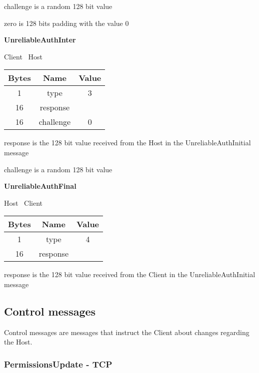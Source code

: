 challenge is a random 128 bit value

zero is 128 bits padding with the value 0

\textbf{UnreliableAuthInter}
\begin{center}
    Client \textrightarrow\ Host\\
    \begin{tabular}{|c|c|c|}
        \hline
        \textbf{Bytes} & \textbf{Name} & \textbf{Value} \\
        \hline
        1              & type          & 3              \\
        \hline
        16             & response     &                \\
        \hline
        16             & challenge          & 0              \\
        \hline
    \end{tabular}
\end{center}

response is the 128 bit value received from the Host in the UnreliableAuthInitial message

challenge is a random 128 bit value

\textbf{UnreliableAuthFinal}
\begin{center}
    Host \textrightarrow\ Client\\
    \begin{tabular}{|c|c|c|}
        \hline
        \textbf{Bytes} & \textbf{Name} & \textbf{Value} \\
        \hline
        1              & type          & 4              \\
        \hline
        16             & response     &                \\
        \hline
    \end{tabular}
\end{center}

response is the 128 bit value received from the Client in the UnreliableAuthInitial message

\subsection{Control messages}
Control messages are messages that instruct the Client about changes regarding the Host.

\subsubsection{PermissionsUpdate - TCP}

